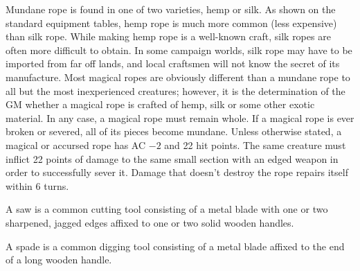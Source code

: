 \begin{multicols}{2}
Mundane rope is found in one of two varieties, hemp or silk.  As shown on the standard equipment tables, hemp rope is much more common (less expensive) than silk rope.  While making hemp rope is a well-known craft, silk ropes are often more difficult to obtain.  In some campaign worlds, silk rope may have to be imported from far off lands, and local craftsmen will not know the secret of its manufacture.  Most magical ropes are obviously different than a mundane rope to all but the most inexperienced creatures; however, it is the determination of the GM whether a magical rope is crafted of hemp, silk or some other exotic material.  In any case, a magical rope must remain whole.  If a magical rope is ever broken or severed, all of its pieces become mundane.  Unless otherwise stated, a magical or accursed rope has AC $-2$ and 22 hit points.  The same creature must inflict 22 points of damage to the same small section with an edged weapon in order to successfully sever it.  Damage that doesn't destroy the rope repairs itself within 6 turns.    

A saw is a common cutting tool consisting of a metal blade with one or two sharpened, jagged edges affixed to one or two solid wooden handles.

A spade is a common digging tool consisting of a metal blade affixed to the end of a long wooden handle.

\noindent \begin{minipage}{\columnwidth}


\end{minipage}
\end{multicols}
